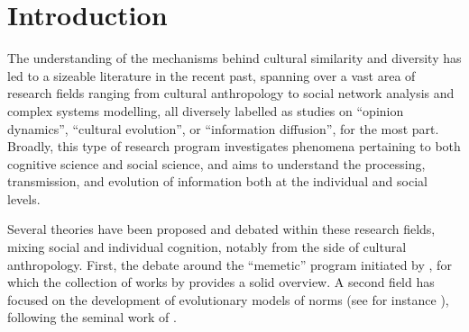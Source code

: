 \section{Introduction} %

The understanding of the mechanisms behind cultural similarity and diversity has led to a sizeable literature in the recent past, spanning over a vast area of research fields ranging from cultural anthropology to social network analysis and complex systems modelling, all diversely labelled as studies on ``opinion dynamics'', ``cultural evolution'', or ``information diffusion'', for the most part.
Broadly, this type of research program investigates phenomena pertaining to both cognitive science and social science, and aims to understand the processing, transmission, and evolution of information both at the individual and social levels.

Several theories have been proposed and debated within these research fields, mixing social and individual cognition, notably from the side of cultural anthropology.
First, the debate around the ``memetic'' program initiated by \citet{Dawkins76}, for which the collection of works by \citet{Aunger00} provides a solid overview.
A second field has focused on the development of evolutionary models of norms (see for instance \citealp{Ehrlich05}), following the seminal work of \citet{Boyd85}.


